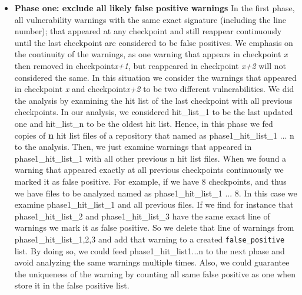 \begin{itemize}

\item{\textbf{Phase one: exclude all likely false positive warnings}} In the first phase, all vulnerability warnings with the same exact signature (including the line number); that appeared at any checkpoint and still reappear continuously until the last checkpoint are considered to be false positives. We emphasis on the continuity of the warnings, as one warning that appears in  checkpoint \textit{x} then removed in checkpoint\textit{x+1}, but reappeared in checkpoint \textit{x+2} will not considered the same. In this situation we consider the warnings that appeared in checkpoint \textit{x} and checkpoint\textit{x+2} to be two different vulnerabilities. We did the analysis by examining the hit list of the last checkpoint with all previous checkpoints. In our analysis, we considered hit\_list\_1 to be the last updated one and hit\_list\_n to be the oldest hit list.
Hence, in this phase we fed copies of \textbf{n} hit list files of a repository that named as phase1\_hit\_list\_1 ... n to the analysis. Then, we just examine warnings that appeared in phase1\_hit\_list\_1 with all other previous n hit list files. When we found a warning that appeared exactly at all previous checkpoints continuously we marked it as false positive. For example, if we have 8 checkpoints, and thus we have files to be analyzed named as phase1\_hit\_list\_1 ... 8.  In this case we examine phase1\_hit\_list\_1 and all previous files. If we find for instance that  phase1\_hit\_list\_2 and phase1\_hit\_list\_3 have the same exact line of warnings we mark it as false positive. So we delete that line of warnings from phase1\_hit\_list\_1,2,3 and add that warning to a created \texttt{false\_positive} list. By doing so, we could feed phase1\_hit\_list1...n to the next phase and avoid analyzing the same warnings multiple times. Also, we could guarantee the uniqueness of the warning by counting all same false positive as one when store it in the false positive list. 



\end{itemize}
